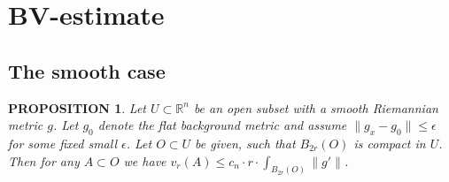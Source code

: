 \documentclass[12pt,leqno]{amsart}
\numberwithin{equation}{section}
\newtheorem{prop}[thm]{PROPOSITION}
\theoremstyle{definition}
\newtheorem{defn}[thm]{Definition}%
\theoremstyle{remark}
\newcommand{\R}{\mathbb{R}}
\def\:{\colon}
\begin{document}






\section{BV-estimate}\label{sec-BV-estimate}
\subsection{The smooth case}

\begin{prop}\label{prop-smooth}
Let $U\subset \R^n$ be an open subset with a smooth Riemannian
metric $g$. Let $g_0$ denote the flat background metric and assume $\|g_x-g_0\| \leq \epsilon$ for some fixed small
$\epsilon$.   Let $O\subset U$ be given, such that $B_{2r} (O)$ is compact in $U$.
Then for any $A\subset O$ we have $v_r (A) \leq c_n \cdot r \cdot \int _{B_{2r} ( O)} \|g'\|$.
\end{prop}
\end{document}
